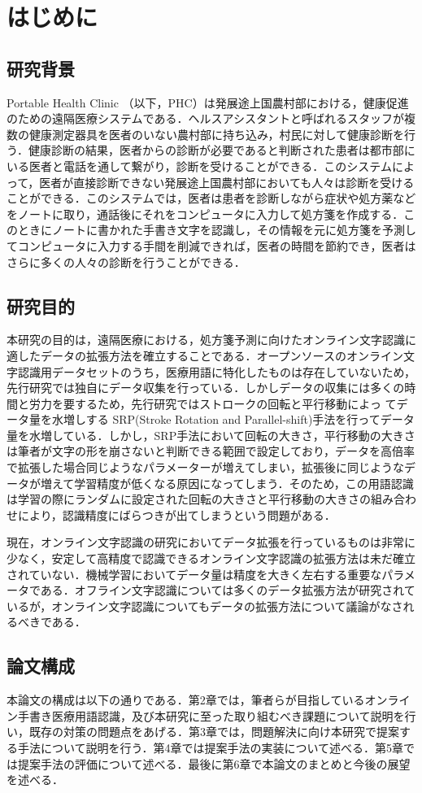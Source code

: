
\chapter{はじめに}
\label{cha:intro}
\section{研究背景}
\label{sec:background}
Portable Health Clinic （以下，PHC）は発展途上国農村部における，健康促進のための遠隔医療システムである\cite{ahmed15:portable}．ヘルスアシスタントと呼ばれるスタッフが複数の健康測定器具を医者のいない農村部に持ち込み，村民に対して健康診断を行う．健康診断の結果，医者からの診断が必要であると判断された患者は都市部にいる医者と電話を通して繋がり，診断を受けることができる．このシステムによって，医者が直接診断できない発展途上国農村部においても人々は診断を受けることができる．このシステムでは，医者は患者を診断しながら症状や処方薬などをノートに取り，通話後にそれをコンピュータに入力して処方箋を作成する．このときにノートに書かれた手書き文字を認識し，その情報を元に処方箋を予測してコンピュータに入力する手間を削減できれば，医者の時間を節約でき，医者はさらに多くの人々の診断を行うことができる．

\section{研究目的}
本研究の目的は，遠隔医療における，処方箋予測に向けたオンライン文字認識に適したデータの拡張方法を確立することである．オープンソースのオンライン文字認識用データセットのうち，医療用語に特化したものは存在していないため，先行研究\cite{takahashi}では独自にデータ収集を行っている．しかしデータの収集には多くの時間と労力を要するため，先行研究\cite{takahashi}ではストロークの回転と平行移動によっ てデータ量を水増しする SRP(Stroke Rotation and Parallel-shift)手法を行ってデータ量を水増している．しかし，SRP手法において回転の大きさ，平行移動の大きさは筆者が文字の形を崩さないと判断できる範囲で設定しており，データを高倍率で拡張した場合同じようなパラメーターが増えてしまい，拡張後に同じようなデータが増えて学習精度が低くなる原因になってしまう．そのため，この用語認識は学習の際にランダムに設定された回転の大きさと平行移動の大きさの組み合わせにより，認識精度にばらつきが出てしまうという問題がある．

現在，オンライン文字認識の研究においてデータ拡張を行っているものは非常に少なく，安定して高精度で認識できるオンライン文字認識の拡張方法は未だ確立されていない．機械学習においてデータ量は精度を大きく左右する重要なパラメータである．オフライン文字認識については多くのデータ拡張方法が研究されているが，オンライン文字認識についてもデータの拡張方法について議論がなされるべきである．


\section{論文構成}
本論文の構成は以下の通りである．第2章では，筆者らが目指しているオンライン手書き医療用語認識，及び本研究に至った取り組むべき課題について説明を行い，既存の対策の問題点をあげる．第3章では，問題解決に向け本研究で提案する手法について説明を行う．第4章では提案手法の実装について述べる．第5章では提案手法の評価について述べる．最後に第6章で本論文のまとめと今後の展望を述べる．
